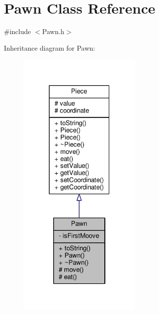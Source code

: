 \hypertarget{class_pawn}{}\section{Pawn Class Reference}
\label{class_pawn}


{\ttfamily \#include $<$Pawn.\+h$>$}



Inheritance diagram for Pawn\+:
\nopagebreak
\begin{figure}[H]
\begin{center}
\leavevmode
\includegraphics[width=172pt]{class_pawn__inherit__graph}
\end{center}
\end{figure}


